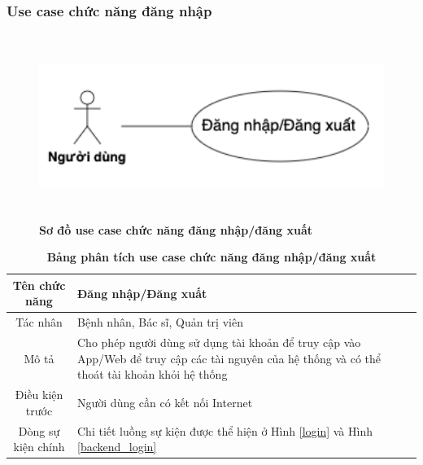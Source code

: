 \subsubsection{Use case chức năng đăng nhập}
  \begin{figure}[H]
    \centering
    \includegraphics[width=15cm,height=6cm]{Images/use_case/use_case_login.png}
    \caption[Sơ đồ use case chức năng đăng nhập/đăng xuất]{\bfseries \fontsize{12pt}{0pt}
    \selectfont Sơ đồ use case chức năng đăng nhập/đăng xuất}
    \label{use_case_login} %
  \end{figure}

  \begin{table}[H]
    \caption{\bfseries \fontsize{12pt}{0pt}\selectfont Bảng phân tích use case chức năng đăng nhập/đăng xuất}
    \centering
    \begin{tabularx}{0.9\textwidth}{|c|X|}
      \hline
      \textbf{Tên chức năng} & \textbf{Đăng nhập/Đăng xuất} \\
      \hline
      Tác nhân & Bệnh nhân, Bác sĩ, Quản trị viên \\
      \hline
      Mô tả & Cho phép người dùng sử dụng tài khoản để truy cập vào App/Web để truy cập các tài nguyên của hệ thống và
      có thể thoát tài khoản khỏi hệ thống\\
      \hline
      Điều kiện trước & Người dùng cần có kết nối Internet \\
      \hline
      Dòng sự kiện chính & 
        Chi tiết luồng sự kiện được thể hiện ở Hình \ref{login} và Hình \ref{backend_login}\\
      \hline
    \end{tabularx}
  \end{table}

